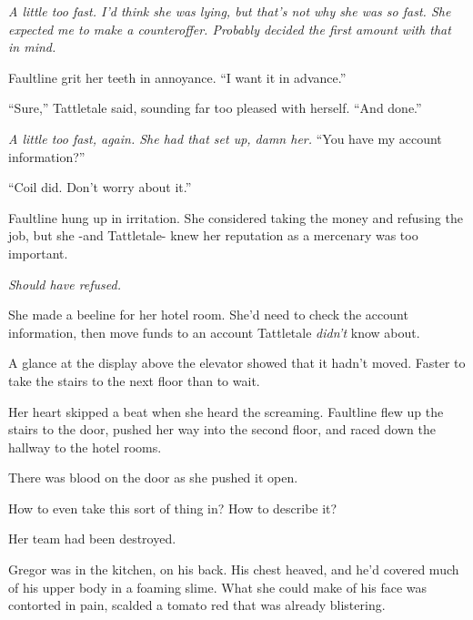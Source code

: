 \emph{A little too fast.  I'd think she was lying, but that's not why she was so fast.  She expected me to make a counteroffer.  Probably decided the first amount with that in mind.}



Faultline grit her teeth in annoyance.  ``I want it in advance.''



``Sure,'' Tattletale said, sounding far too pleased with herself.  ``And done.''



\emph{A little too fast, again.  She had that set up, damn her.  }``You have my account information?''



``Coil did.  Don't worry about it.''



Faultline hung up in irritation.  She considered taking the money and refusing the job, but she -and Tattletale- knew her reputation as a mercenary was too important.



\emph{Should have refused.}



She made a beeline for her hotel room.  She'd need to check the account information, then move funds to an account Tattletale \emph{didn't} know about.



A glance at the display above the elevator showed that it hadn't moved.  Faster to take the stairs to the next floor than to wait.



Her heart skipped a beat when she heard the screaming.  Faultline flew up the stairs to the door, pushed her way into the second floor, and raced down the hallway to the hotel rooms.



There was blood on the door as she pushed it open.



How to even take this sort of thing in?  How to describe it?



Her team had been destroyed.



Gregor was in the kitchen, on his back.  His chest heaved, and he'd covered much of his upper body in a foaming slime.  What she could make of his face was contorted in pain, scalded a tomato red that was already blistering.



